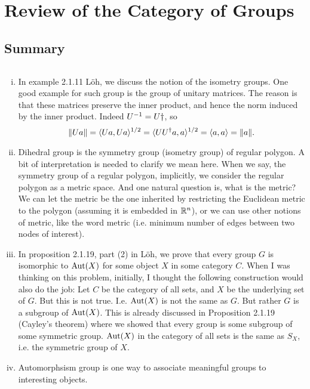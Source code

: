 \chapter{Review of the Category of Groups}


\section{Summary}

\begin{summary}
	$  $\\
	\begin{enumerate}[(i)]
		\item In example 2.1.11 L\"{o}h, we discuss the notion of the isometry groups. One good example for such group is the group of unitary matrices. The reason is that these matrices preserve the inner product, and hence the norm induced by the inner product. Indeed $ U^{-1} = U\dagger $, so
		\[ \norm{U a} = \langle Ua, Ua \rangle^{1/2} = \langle UU^\dagger a, a\rangle^{1/2} = \langle a,a \rangle =  \norm{a}. \]
		
		
		\item Dihedral group is the symmetry group (isometry group) of regular polygon. A bit of interpretation is needed to clarify we mean here. When we say, the symmetry group of a regular polygon, implicitly, we consider the regular polygon as a metric space. And one natural question is, what is the metric? We can let the metric be the one inherited by restricting the Euclidean metric to the polygon (assuming it is embedded in $ \mathbb{R}^n $), or we can use other notions of metric, like the word metric (i.e. minimum number of edges between two nodes of interest). 
		
		
		\item In proposition 2.1.19, part (2) in L\"{o}h, we prove that every group $ G $ is isomorphic to $ \operatorname{Aut}(X) $ for some object $ X $ in some category $ C $. When I was thinking on this problem, initially, I thought the following construction would also do the job: Let $ C $ be the category of all sets, and $ X $ be the underlying set of $ G $. But this is not true. I.e. $ \operatorname{Aut}(X) $ is not the same as $ G $. But rather $ G $ is a subgroup of $ \operatorname{Aut}(X) $. This is already discussed in Proposition 2.1.19 (Cayley's theorem) where we showed that every group is some subgroup of some symmetric group. $ \operatorname{Aut}(X) $ in the category of all sets is the same as $ S_X $, i.e. the symmetric group of $ X $.
		
		\item Automorphsism group is one way to associate meaningful groups to interesting objects.
		
		
	
	\end{enumerate}
\end{summary}

